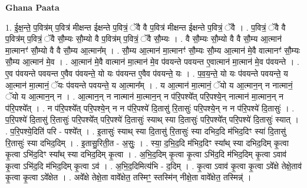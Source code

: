 \documentclass[17pt]{extarticle}
\begin{document}
\textbf{Ghana Paata } \newline

1. ई॒क्ष॒न्ते॒ प॒वित्र॑म् प॒वित्र॑ मीक्षन्त ईक्षन्ते प॒वित्रं॒ ॅवै वै प॒वित्र॑ मीक्षन्त ईक्षन्ते प॒वित्रं॒ ॅवै । . प॒वित्रं॒ ॅवै वै प॒वित्र॑म् प॒वित्रं॒ ॅवै सौ॒म्यः सौ॒म्यो वै प॒वित्र॑म् प॒वित्रं॒ ॅवै सौ॒म्यः । . वै सौ॒म्यः सौ॒म्यो वै वै सौ॒म्य आ॒त्मान॑ मा॒त्मानꣳ॑ सौ॒म्यो वै वै सौ॒म्य आ॒त्मान᳚म् । . सौ॒म्य आ॒त्मान॑ मा॒त्मानꣳ॑ सौ॒म्यः सौ॒म्य आ॒त्मान॑ मे॒वै वात्मानꣳ॑ सौ॒म्यः सौ॒म्य आ॒त्मान॑ मे॒व । . आ॒त्मान॑ मे॒वै वात्मान॑ मा॒त्मान॑ मे॒व प॑वयन्ते पवयन्त ए॒वात्मान॑ मा॒त्मान॑ मे॒व प॑वयन्ते । . ए॒व प॑वयन्ते पवयन्त ए॒वैव प॑वयन्ते॒ यो यः प॑वयन्त ए॒वैव प॑वयन्ते॒ यः । . प॒व॒य॒न्ते॒ यो यः प॑वयन्ते पवयन्ते॒ य आ॒त्मान॑ मा॒त्मानं॒ ॅयः प॑वयन्ते पवयन्ते॒ य आ॒त्मान᳚म् । . य आ॒त्मान॑ मा॒त्मानं॒ ॅयो य आ॒त्मान॒न् न नात्मानं॒ ॅयो य आ॒त्मान॒न् न । . आ॒त्मान॒न् न नात्मान॑ मा॒त्मान॒न् न प॑रि॒पश्ये᳚त् परि॒पश्ये॒न् नात्मान॑ मा॒त्मान॒न् न प॑रि॒पश्ये᳚त् । . न प॑रि॒पश्ये᳚त् परि॒पश्ये॒न् न न प॑रि॒पश्ये॑ दि॒तासु॑ रि॒तासुः॑ परि॒पश्ये॒न् न न प॑रि॒पश्ये॑ दि॒तासुः॑ । . प॒रि॒पश्ये॑ दि॒तासु॑ रि॒तासुः॑ परि॒पश्ये᳚त् परि॒पश्ये॑ दि॒तासुः॑ स्याथ् स्या दि॒तासुः॑ परि॒पश्ये᳚त् परि॒पश्ये॑ दि॒तासुः॑ स्यात् । . प॒रि॒पश्ये॒दिति॑ परि - पश्ये᳚त् । . इ॒तासुः॑ स्याथ् स्या दि॒तासु॑ रि॒तासुः॑ स्या दभिद॒दि म॑भिद॒दिꣳ स्या॑ दि॒तासु॑ रि॒तासुः॑ स्या दभिद॒दिम् । . इ॒तासु॒रिती॒त - अ॒सुः॒ । . स्या॒ द॒भि॒द॒दि म॑भिद॒दिꣳ स्या᳚थ् स्या दभिद॒दिम् कृ॒त्वा कृ॒त्वा ऽभि॑द॒दिꣳ स्या᳚थ् स्या दभिद॒दिम् कृ॒त्वा । . अ॒भि॒द॒दिम् कृ॒त्वा कृ॒त्वा ऽभि॑द॒दि म॑भिद॒दिम् कृ॒त्वा ऽवाव॑ कृ॒त्वा ऽभि॑द॒दि म॑भिद॒दिम् कृ॒त्वा ऽव॑ । . अ॒भि॒द॒दिमित्य॑भि - द॒दिम् । . कृ॒त्वा ऽवाव॑ कृ॒त्वा कृ॒त्वा ऽवे᳚क्षे तेक्षे॒ताव॑ कृ॒त्वा कृ॒त्वा ऽवे᳚क्षेत । . अवे᳚क्षे तेक्षे॒ता वावे᳚क्षेत॒ तस्मिꣳ॒॒ स्तस्मि॑न् नीक्षे॒ता वावे᳚क्षेत॒ तस्मिन्न्॑ । \newline
\end{document}
